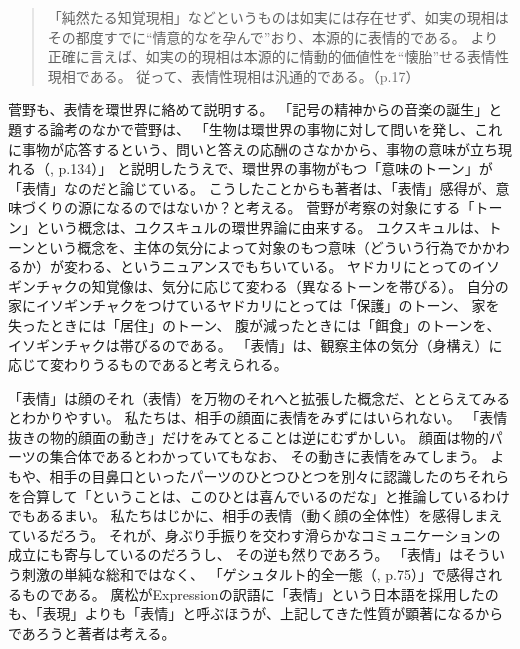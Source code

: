 \begin{quote}
  「純然たる知覚現相」などというものは如実には存在せず、如実の現相はその都度すでに“情意的なを孕んで”おり、本源的に表情的である。
  より正確に言えば、如実の的現相は本源的に情動的価値性を“懐胎”せる表情性現相である。
  従って、表情性現相は汎通的である。（p.17）
\end{quote}


菅野\cite{sugeno:1998}も、表情を環世界に絡めて説明する。
「記号の精神からの音楽の誕生」と題する論考のなかで菅野は、
「生物は環世界の事物に対して問いを発し、これに事物が応答するという、問いと答えの応酬のさなかから、事物の意味が立ち現れる（\cite{sugeno:1998}, p.134）」
と説明したうえで、環世界の事物がもつ「意味のトーン」が「表情」なのだと論じている。
こうしたことからも著者は、「表情」感得が、意味づくりの源になるのではないか？と考える。
菅野が考察の対象にする「トーン」という概念は、ユクスキュルの環世界論に由来する。
ユクスキュルは、トーンという概念\cite{uexkull:1934}を、主体の気分によって対象のもつ意味（どういう行為でかかわるか）が変わる、というニュアンスでもちいている。
ヤドカリにとってのイソギンチャクの知覚像は、気分に応じて変わる（異なるトーンを帯びる）。
自分の家にイソギンチャクをつけているヤドカリにとっては「保護」のトーン、
家を失ったときには「居住」のトーン、
腹が減ったときには「餌食」のトーンを、イソギンチャクは帯びるのである。 
「表情」は、観察主体の気分（身構え）に応じて変わりうるものであると考えられる。


「表情」は顔のそれ（表情）を万物のそれへと拡張した概念だ、ととらえてみるとわかりやすい。
私たちは、相手の顔面に表情をみずにはいられない。
「表情抜きの物的顔面の動き」だけをみてとることは逆にむずかしい。
顔面は物的パーツの集合体であるとわかっていてもなお、
その動きに表情をみてしまう。
よもや、相手の目鼻口といったパーツのひとつひとつを別々に認識したのちそれらを合算して「ということは、このひとは喜んでいるのだな」と推論しているわけでもあるまい。
私たちはじかに、相手の表情（動く顔の全体性）を感得しまえているだろう。
それが、身ぶり手振りを交わす滑らかなコミュニケーションの成立にも寄与しているのだろうし、
その逆も然りであろう。
「表情」はそういう刺激の単純な総和ではなく、
「ゲシュタルト的全一態（\cite{hiromatsu:1989}, p.75）」で感得されるものである。
廣松がExpressionの訳語に「表情」という日本語を採用したのも、「表現」よりも「表情」と呼ぶほうが、上記してきた性質が顕著になるからであろうと著者は考える。

